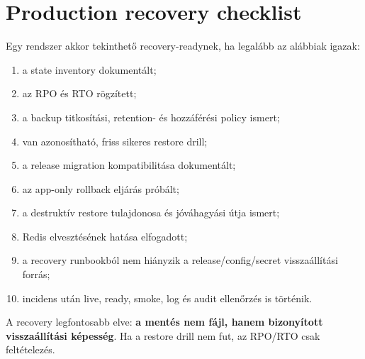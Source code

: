 \section{Production recovery checklist}

Egy rendszer akkor tekinthető recovery-readynek, ha legalább az alábbiak igazak:

\begin{enumerate}
  \item a state inventory dokumentált;
  \item az RPO és RTO rögzített;
  \item a backup titkosítási, retention- és hozzáférési policy ismert;
  \item van azonosítható, friss sikeres restore drill;
  \item a release migration kompatibilitása dokumentált;
  \item az app-only rollback eljárás próbált;
  \item a destruktív restore tulajdonosa és jóváhagyási útja ismert;
  \item Redis elvesztésének hatása elfogadott;
  \item a recovery runbookból nem hiányzik a release/config/secret visszaállítási forrás;
  \item incidens után live, ready, smoke, log és audit ellenőrzés is történik.
\end{enumerate}

A recovery legfontosabb elve: \textbf{a mentés nem fájl, hanem bizonyított visszaállítási képesség}. Ha a restore drill nem fut, az RPO/RTO csak feltételezés.
